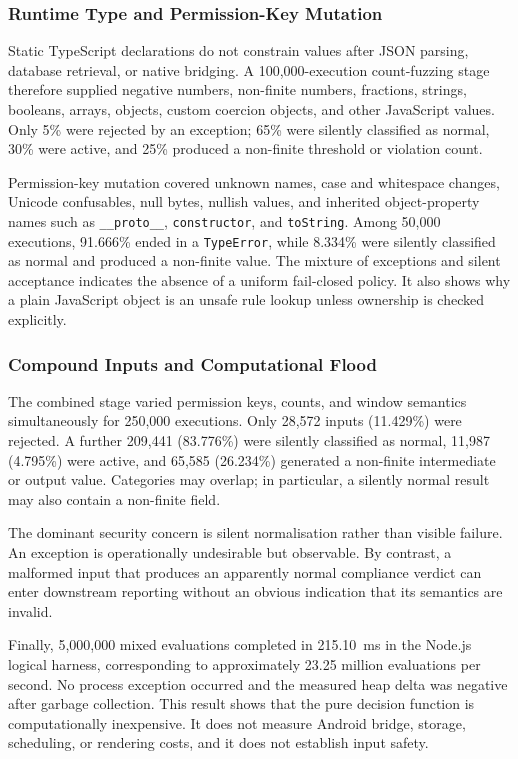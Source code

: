 \subsubsection{Runtime Type and Permission-Key Mutation}

Static TypeScript declarations do not constrain values after JSON parsing, database retrieval, or native bridging. A 100,000-execution count-fuzzing stage therefore supplied negative numbers, non-finite numbers, fractions, strings, booleans, arrays, objects, custom coercion objects, and other JavaScript values. Only 5\% were rejected by an exception; 65\% were silently classified as normal, 30\% were active, and 25\% produced a non-finite threshold or violation count.

Permission-key mutation covered unknown names, case and whitespace changes, Unicode confusables, null bytes, nullish values, and inherited object-property names such as \texttt{\_\_proto\_\_}, \texttt{constructor}, and \texttt{toString}. Among 50,000 executions, 91.666\% ended in a \texttt{TypeError}, while 8.334\% were silently classified as normal and produced a non-finite value. The mixture of exceptions and silent acceptance indicates the absence of a uniform fail-closed policy. It also shows why a plain JavaScript object is an unsafe rule lookup unless ownership is checked explicitly.

\subsubsection{Compound Inputs and Computational Flood}

The combined stage varied permission keys, counts, and window semantics simultaneously for 250,000 executions. Only 28,572 inputs (11.429\%) were rejected. A further 209,441 (83.776\%) were silently classified as normal, 11,987 (4.795\%) were active, and 65,585 (26.234\%) generated a non-finite intermediate or output value. Categories may overlap; in particular, a silently normal result may also contain a non-finite field.

The dominant security concern is silent normalisation rather than visible failure. An exception is operationally undesirable but observable. By contrast, a malformed input that produces an apparently normal compliance verdict can enter downstream reporting without an obvious indication that its semantics are invalid.

Finally, 5,000,000 mixed evaluations completed in 215.10~ms in the Node.js logical harness, corresponding to approximately 23.25 million evaluations per second. No process exception occurred and the measured heap delta was negative after garbage collection. This result shows that the pure decision function is computationally inexpensive. It does not measure Android bridge, storage, scheduling, or rendering costs, and it does not establish input safety.

